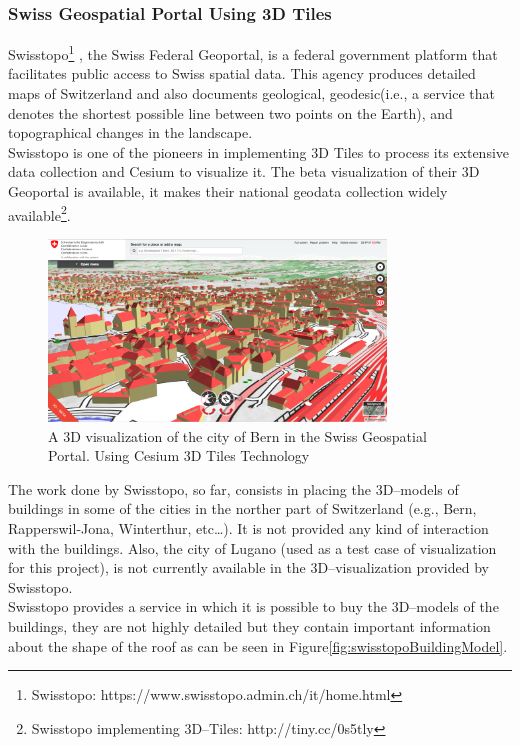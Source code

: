 \subsubsection{Swiss Geospatial Portal Using 3D Tiles}
Swisstopo\footnote{Swisstopo: https://www.swisstopo.admin.ch/it/home.html} , the Swiss Federal Geoportal, is a federal government platform that facilitates public access to Swiss spatial data.
This agency produces detailed maps of Switzerland and also documents geological, geodesic(i.e., a service that denotes the shortest possible line between two points on the Earth), and topographical changes in the landscape.\\
Swisstopo is one of the pioneers in implementing 3D Tiles to process its extensive data collection and Cesium to visualize it. The beta visualization of their 3D Geoportal is available, it makes their national geodata collection widely available\footnote{Swisstopo implementing 3D--Tiles: http://tiny.cc/0s5tly}.
\begin{figure} [H]
\centering
\includegraphics[width=0.8\textwidth]{chapter2/images/BernCitySwissTopo}
\caption{A 3D visualization of the city of Bern in the Swiss Geospatial Portal. Using Cesium 3D Tiles Technology}
\label{fig:BernCitySwissTopo}
\end{figure}
The work done by Swisstopo, so far, consists in placing the 3D--models of buildings in some of the cities in the norther part of Switzerland (e.g., Bern, Rapperswil-Jona, Winterthur, etc\dots ). It is not provided any kind of interaction with the buildings. Also, the city of Lugano (used as a test case of visualization for this project), is not currently available in the 3D--visualization provided by Swisstopo.\\
Swisstopo provides a service in which it is possible to buy the 3D--models of the buildings, they are not highly detailed but they contain important information about the shape of the roof as can be seen in Figure\ref{fig:swisstopoBuildingModel}.
